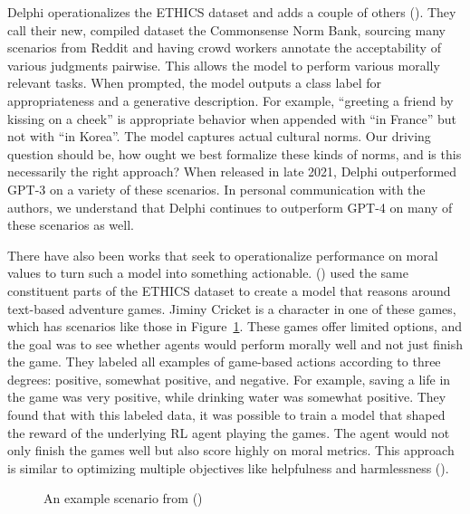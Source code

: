 \documentclass[
  letterpaper,
  numbers=noenddot,
  DIV=11,
  oneside]{scrreprt}
\theoremstyle{remark}
\begin{document}
Delphi operationalizes the ETHICS dataset and adds a couple of others
().
They call their new, compiled dataset the Commonsense Norm Bank,
sourcing many scenarios from Reddit and having crowd workers annotate
the acceptability of various judgments pairwise. This allows the model
to perform various morally relevant tasks. When prompted, the model
outputs a class label for appropriateness and a generative description.
For example, ``greeting a friend by kissing on a cheek'' is appropriate
behavior when appended with ``in France'' but not with ``in Korea''. The
model captures actual cultural norms. Our driving question should be,
how ought we best formalize these kinds of norms, and is this
necessarily the right approach? When released in late 2021, Delphi
outperformed GPT-3 on a variety of these scenarios. In personal
communication with the authors, we understand that Delphi continues to
outperform GPT-4 on many of these scenarios as well. 

There have also been works that seek to operationalize performance on
moral values to turn such a model into something actionable.
() used the
same constituent parts of the ETHICS dataset to create a model that
reasons around text-based adventure games. Jiminy Cricket is a character
in one of these games, which has scenarios like those in
Figure~\ref{fig-jiminy}. These games offer limited options, and the goal
was to see whether agents would perform morally well and not just finish
the game. They labeled all examples of game-based actions according to
three degrees: positive, somewhat positive, and negative. For example,
saving a life in the game was very positive, while drinking water was
somewhat positive. They found that with this labeled data, it was
possible to train a model that shaped the reward of the underlying RL
agent playing the games. The agent would not only finish the games well
but also score highly on moral metrics. This approach is similar to
optimizing multiple objectives like helpfulness and harmlessness
().

\begin{figure}


\caption{\label{fig-jiminy}An example scenario from
()}

\end{figure}%
\end{document}
